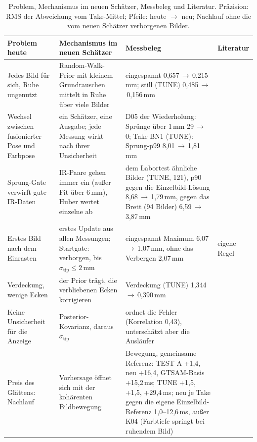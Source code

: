 \documentclass[11pt,a4paper,fleqn]{article}
\newcommand{\stip}{\sigma_{\mathrm{tip}}}
\begin{document}
\begin{table}[!htb]
\centering\small
\caption{Problem, Mechanismus im neuen Schätzer, Messbeleg und Literatur. Präzision: RMS der Abweichung vom
Take-Mittel; Pfeile: heute $\to$ neu; Nachlauf ohne die vom neuen Schätzer verborgenen Bilder.}
\label{tab:warum}
\renewcommand{\arraystretch}{1.1}
\begin{tabularx}{\textwidth}{@{}>{\raggedright\arraybackslash}p{30mm}>{\raggedright\arraybackslash}X>{\raggedright\arraybackslash}p{58mm}>{\raggedright\arraybackslash}p{15mm}@{}}
  \toprule
  Problem heute & Mechanismus im neuen Schätzer & Messbeleg & Literatur \\
  \midrule
  Jedes Bild für sich, Ruhe ungenutzt
    & Random-Walk-Prior mit kleinem Grundrauschen mittelt in Ruhe über viele Bilder
    & eingespannt 0,657\,$\to$\,0,215\,mm; still (TUNE) 0,485\,$\to$\,0,156\,mm
    & \cite{saerkkae2013bayesian, lepetit2005monocular} \\
  Wechsel zwischen fusionierter Pose und Farbpose
    & ein Schätzer, eine Ausgabe; jede Messung wirkt nach ihrer Unsicherheit
    & D05 der Wiederholung: Sprünge über 1\,mm 29\,$\to$\,0; Take BN1 (TUNE): Sprung-p99 8,01\,$\to$\,1,81\,mm
    & \cite{tobergte2009robust, murartal2017orbslam2} \\
  Sprung-Gate verwirft gute IR-Daten
    & IR-Paare gehen immer ein (außer Fit über 6\,mm), Huber wertet einzelne ab
    & dem Labortest ähnliche Bilder (TUNE, 121), p90 gegen die Einzelbild-Lösung 8,68\,$\to$\,1,79\,mm, gegen das
      Brett (94 Bilder) 6,59\,$\to$\,3,87\,mm
    & \cite{triggs2000bundle, kerl2013robust, zhang1997parameter} \\
  Erstes Bild nach dem Einrasten
    & erstes Update aus allen Messungen; Startgate: verborgen, bis $\stip \le 2$\,mm
    & eingespannt Maximum 6,07\,$\to$\,1,07\,mm, ohne das Verbergen 2,07\,mm
    & eigene Regel \\
  Verdeckung, wenige Ecken
    & der Prior trägt, die verbliebenen Ecken korrigieren
    & Verdeckung (TUNE) 1,344\,$\to$\,0,390\,mm
    & \cite{welch1996scaatdiss} \\
  Keine Unsicherheit für die Anzeige
    & Posterior-Kovarianz, daraus $\stip$
    & ordnet die Fehler (Korrelation 0,43), unterschätzt aber die Ausläufer
    & \cite{sola2018micro, simpson2014computation} \\
  Preis des Glättens: Nachlauf
    & Vorhersage öffnet sich mit der kohärenten Bildbewegung
    & Bewegung, gemeinsame Referenz: TEST A +1,4, neu +16,4, GTSAM-Basis +15,2\,ms; TUNE +1,5, +1,5, +29,4\,ms;
      neu je Take gegen die eigene Einzelbild-Referenz 1,0--12,6\,ms, außer K04 (Farbtiefe springt bei ruhendem
      Bild)
    & \cite{casiez2012oneeuro, cai2024distributed} \\
  \bottomrule
\end{tabularx}
\end{table}
\end{document}

